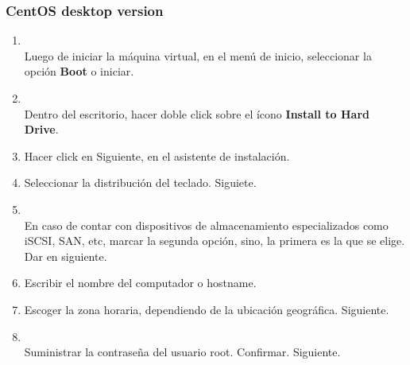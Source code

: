 \documentclass[11pt]{article}
\begin{document}
	\subsubsection{CentOS desktop version}	
		\begin{enumerate}
			\item 
				\begin{minipage}[t]{\linewidth}
			        \raggedright
			        \medskip
			        \\Luego de iniciar la máquina virtual, en el menú de inicio, seleccionar la opción \textbf{Boot} o iniciar. 
		        \end{minipage}

		    \item
		    	\begin{minipage}[t]{\linewidth}
			        \raggedright
			        \medskip
			        \\Dentro del escritorio, hacer doble click sobre el ícono \textbf{Install to Hard Drive}. 
		        \end{minipage}	

		    \item Hacer click en Siguiente, en el asistente de instalación.
		    \item Seleccionar la distribución del teclado. Siguiete.
		    \item 
		    	\begin{minipage}[t]{\linewidth}
			        \raggedright
			        \medskip
			        \\En caso de contar con dispositivos de almacenamiento especializados como iSCSI, SAN, etc, marcar la segunda opción, sino, la primera es la que se elige. Dar en siguiente. 
		        \end{minipage}	

		    \item Escribir el nombre del computador o hostname.
		    \item Escoger la zona horaria, dependiendo de la ubicación geográfica. Siguiente.
		    \item 
		    	\begin{minipage}[t]{\linewidth}
			        \raggedright
			        \medskip
			        \\Suministrar la contraseña del usuario root. Confirmar. Siguiente. 
		        \end{minipage}


\end{enumerate}
\end{document}
